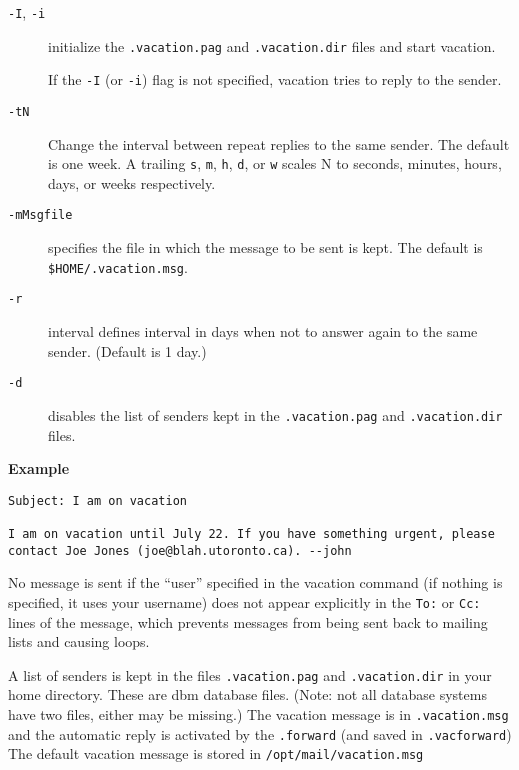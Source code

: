 \begin{description}
\item[{\tt -I}, {\tt -i}] \mbox{}

initialize the {\tt .vacation.pag} 
and {\tt .vacation.dir} files and start vacation.

If the {\tt -I} (or {\tt -i}) flag is not specified, vacation 
tries to reply to the sender.



\item[{\tt -tN}] \mbox{}

Change the interval between repeat replies to the same 
sender. The default is one week. A trailing {\tt s}, {\tt m}, 
{\tt h}, {\tt d}, or {\tt w} scales N to seconds, minutes, 
hours, days, or weeks respectively.



\item[{\tt -mMsgfile}] \mbox{}

specifies the file in which the message to be 
sent is kept. 
The default is {\tt \$HOME/.vacation.msg}.



\item[{\tt -r}] \mbox{}

interval defines interval in days when not to answer 
again to the same sender. (Default is 1 day.)



\item[{\tt -d}] \mbox{}

disables the list of senders kept in the 
{\tt .vacation.pag} and {\tt .vacation.dir} files.

\end{description}


{\bf Example}

\begin{verbatim}
Subject: I am on vacation

I am on vacation until July 22. If you have something urgent, please 
contact Joe Jones (joe@blah.utoronto.ca). --john
\end{verbatim}


No message is sent if the ``user'' specified in the vacation  
command (if nothing is specified, it uses your username) does 
not appear explicitly in the {\tt To:} or {\tt Cc:} lines of the 
message, which prevents messages from being sent back to mailing lists 
and causing loops.

A list of senders is kept in the files {\tt .vacation.pag} and 
{\tt .vacation.dir} in your home directory. These are dbm database 
files. (Note: not all database systems have two files, either may be 
missing.) The vacation message is in {\tt .vacation.msg} and 
the automatic reply is activated by the {\tt .forward} (and 
saved in {\tt .vacforward}) The default vacation message is 
stored in {\tt /opt/mail/vacation.msg}

